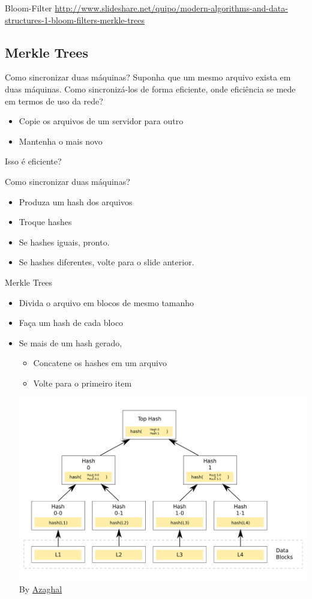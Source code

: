 \begin{frame}{Bloom-Filter}
\url{http://www.slideshare.net/quipo/modern-algorithms-and-data-structures-1-bloom-filters-merkle-trees}
\end{frame}


\subsection{Merkle Trees}
\begin{frame}{Como sincronizar duas máquinas?}
Suponha que um mesmo arquivo exista em duas máquinas. Como sincronizá-los de forma eficiente, onde eficiência se mede em termos de uso da rede?

\begin{itemize}
	\item Copie os arquivos de um servidor para outro
	\item Mantenha o mais novo
\end{itemize}

Isso é eficiente?
\end{frame}

\begin{frame}{Como sincronizar duas máquinas?}
\begin{itemize}
		\item Produza um hash dos arquivos
		\item Troque hashes
		\item Se hashes iguais, pronto.
		\item Se hashes diferentes, volte para o slide anterior.
\end{itemize}
\end{frame}

\begin{frame}{Merkle Trees}
	\begin{itemize}
		\item Divida o arquivo em blocos de mesmo tamanho
		\item Faça um hash de cada bloco
		\item Se mais de um hash gerado, 
		\begin{itemize}
			\item Concatene os hashes em um arquivo
			\item Volte para o primeiro item
		\end{itemize}
	\includegraphics[width=.7\textwidth]{./images/merkle_tree.png} By \href{https://commons.wikimedia.org/w/index.php?curid=18157888}{Azaghal} 
	\end{itemize}
\end{frame}


